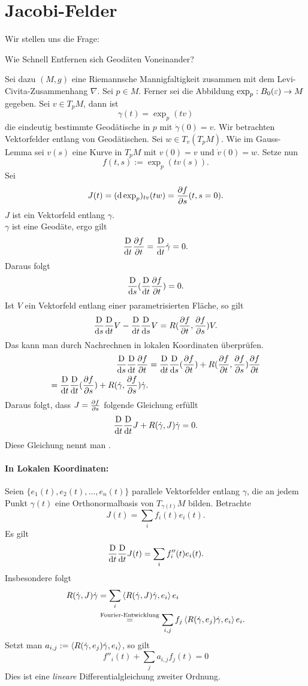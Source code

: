 \newpage
\section{Jacobi-Felder}
Wir stellen uns die Frage:
\begin{center}
	Wie Schnell Entfernen sich Geodäten Voneinander?
\end{center}
Sei dazu $(M,g)$ eine Riemannsche Mannigfaltigkeit zusammen mit dem Levi-Civita-Zusammenhang $\nabla$. Sei $p \in M$. Ferner sei die Abbildung $\exp_p : B_0(\varepsilon) \overset{}{\rightarrow} M$ gegeben. Sei $v \in T_pM$, dann ist
\[ \gamma(t) = \exp_p(tv) \]
die eindeutig bestimmte Geodätische in $p$ mit $\dot{\gamma}(0) = v$. Wir betrachten Vektorfelder entlang von Geodätischen. Sei $w \in T_v(T_pM)$. Wie im Gauss-Lemma sei $v(s)$ eine Kurve in $T_pM$ mit $v(0) = v$ und $\dot{v} (0) = w$. Setze nun
\[ f(t,s) := \exp_p(tv(s)). \]
Sei
\[ J(t) = (\text{d} \exp_p)_{tv}(tw) = \frac{\partial f}{\partial s} (t, s = 0). \]
$J$ ist ein Vektorfeld entlang $\gamma$.\\
$\gamma$ ist eine Geodäte, ergo gilt
\[ \frac{\text{D}}{\text{d} t} \frac{\partial f}{\partial t} = \frac{\text{D}}{\text{d} t}\dot{\gamma} = 0. \]
Daraus folgt
\[ \frac{\text{D}}{\text{d} s} (\frac{\text{D}}{\text{d} t} \frac{\partial f}{\partial t}) = 0. \]
Ist $V$ ein Vektorfeld entlang einer parametrisierten Fläche, so gilt
\[ \frac{\text{D}}{\text{d} s}\frac{\text{D}}{\text{d} t} V - \frac{\text{D}}{\text{d} t} \frac{\text{D}}{\text{d} s} V = R(\frac{\partial f}{\partial t}, \frac{\partial f}{\partial s}) V. \]
Das kann man durch Nachrechnen in lokalen Koordinaten überprüfen.
\begin{align*}
\frac{\text{D}}{\text{d} s} \frac{\text{D}}{\text{d} t} \frac{\partial f}{\partial t} &= \frac{\text{D}}{\text{d} t} \frac{\text{D}}{\text{d} s} (\frac{\partial f}{\partial t}) + R(\frac{\partial f}{\partial t}, \frac{\partial f}{\partial s})\frac{\partial f}{\partial t}\\
= \frac{\text{D}}{\text{d} t} \frac{\text{D}}{\text{d} t} (\frac{\partial f}{\partial s})  + R(\dot{\gamma}, \frac{\partial f}{\partial s}) \dot{\gamma}.
\end{align*}
Daraus folgt, dass $J = \frac{\partial f}{\partial s}$ folgende Gleichung erfüllt
\[ \frac{\text{D}}{\text{d} t}\frac{\text{D}}{\text{d} t}J + R(\dot{\gamma}, J) \dot{\gamma} = 0. \]
Diese Gleichung nennt man .

\paragraph{In Lokalen Koordinaten:}
Seien $\{e_1(t), e_2(t), \ldots, e_n(t)\}$ parallele Vektorfelder entlang $\gamma$, die an jedem Punkt $\gamma(t)$ eine Orthonormalbasis von $T_{\gamma(t)}M$ bilden. Betrachte
\[ J(t) = \sum_i f_i(t) e_i(t). \]
Es gilt
\begin{align*}
\frac{\text{D}}{\text{d} t}\frac{\text{D}}{\text{d} t} J(t) = \sum_i f_i''(t) e_i(t).
\end{align*}
Insbesondere folgt
\begin{align*}
 R(\dot{\gamma}, J) \dot{\gamma} &= \sum_i \left< R(\dot{\gamma}, J)  \dot{\gamma}, e_i\right>e_i\\
 &\overset{\text{Fourier-Entwicklung}}{=} \sum_{i,j} f_j \left< R(\dot{\gamma}, e_j) \dot{\gamma}, e_i \right>e_i.
\end{align*}
Setzt man $a_{i,j} := \left< R(\dot{\gamma}, e_j) \dot{\gamma}, e_i \right>$, so gilt
\[ f''_i(t) +\sum_j a_{i,j} f_j(t) = 0 \]
Dies ist eine \emph{lineare} Differentialgleichung zweiter Ordnung.

